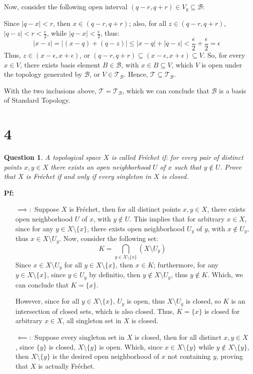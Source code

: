 \documentclass{article}
\newtheorem{question}{Question}
\begin{document}
Now, consider the following open interval $(q-r,q+r)\in V_q\subseteq \mathcal{B}$:

Since $|q-x|<r$, then $x\in (q-r,q+r)$; also, for all $z\in (q-r,q+r)$, $|q-z|<r<\frac{\epsilon}{2}$, while $|q-x|<\frac{\epsilon}{2}$, thus:
$$|x-z| = |(x-q)+(q-z)| \leq |x-q|+|q-z| < \frac{\epsilon}{2}+\frac{\epsilon}{2} = \epsilon$$
Thus, $z\in (x-\epsilon,x+\epsilon)$, or $(q-r,q+r)\subseteq(x-\epsilon,x+\epsilon)\subseteq V$.
So, for every $x\in V$, there exists basis element $B\in\mathcal{B}$, with $x\in B\subseteq V$, which $V$ is open under the topology generated by $\mathcal{B}$,
or $V\in \mathcal{T_B}$. Hence, $\mathcal{T}\subseteq \mathcal{T_B}$.

\hfill

With the two inclusions above, $\mathcal{T}=\mathcal{T_B}$, which we can conclude that $\mathcal{B}$ is a basis of Standard Topology.


\break

\section*{4}
\begin{question}
    A topological space $X$ is called Fréchet if: for every pair of distinct points 
    $x, y \in X$ there exists an open neighborhood $U$ of $x$ such that $y\notin U$. Prove that 
    $X$ is Fréchet if and only if every singleton in $X$ is closed.
\end{question}

\textbf{Pf:}
\begin{itemize}
    \item[$\implies:$]
    Suppose $X$ is Fréchet, then for all distinct points $x,y\in X$, there exists open neighborhood $U$ of $x$, with $y\notin U$.
    This implies that for arbitrary $x\in X$, since for any $y\in X\setminus\{x\}$, there exists open neighborhood $U_y$ of $y$, with $x\notin U_y$,
    thus $x\in X\setminus U_y$. Now, consider the following set:
    $$K=\bigcap_{y\in X\setminus\{x\}}(X\setminus U_y)$$
    Since $x\in X\setminus U_y$ for all $y\in X\setminus\{x\}$, then $x\in K$; furthermore, for any $y\in X\setminus\{x\}$, 
    since $y\in U_y$ by definitio, then $y\notin X\setminus U_y$, thus $y\notin K$. Which, we can conclude that $K=\{x\}$.

    However, since for all $y\in X\setminus\{x\}$, $U_y$ is open, thus $X\setminus U_y$ is closed, so $K$ is an intersection of closed sets, 
    which is also closed. Thus, $K=\{x\}$ is closed for arbitrary $x\in X$, all singleton set in $X$ is closed.
    

    \hfill

    \item[$\impliedby:$] 
    Suppose every singleton set in $X$ is closed, then for all distinct $x,y\in X$, since $\{y\}$ is closed, $X\setminus\{y\}$ is open.
    Which, since $x\in X\setminus\{y\}$ while $y\notin X\setminus\{y\}$, then $X\setminus\{y\}$ is the desired open neighborhood of $x$ not containing $y$, 
    proving that $X$ is actually Fréchet.

\end{itemize}
\end{document}
